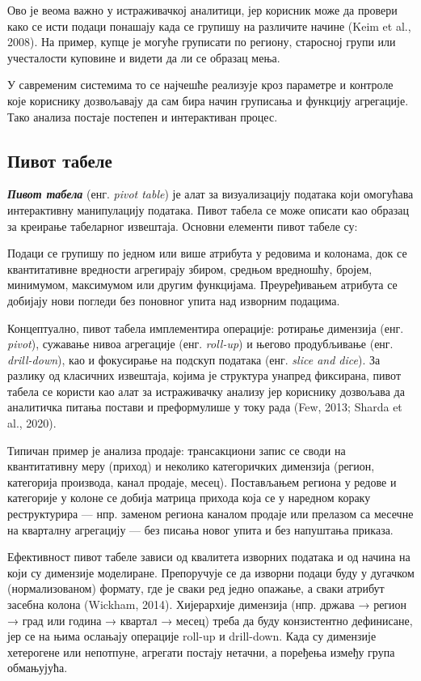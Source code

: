 Ово је веома важно у истраживачкој аналитици, јер корисник може да провери како се исти подаци понашају када се групишу на различите начине (Keim et al., 2008). На пример, купце је могуће груписати по региону, старосној групи или учесталости куповине и видети да ли се образац мења.

У савременим системима то се најчешће реализује кроз параметре и контроле које кориснику дозвољавају да сам бира начин груписања и функцију агрегације. Тако анализа постаје постепен и интерактиван процес.

\subsection{Пивот табеле}
\textbf{\textit{Пивот табела}} (енг. \textit{pivot table}) је алат за визуализацију података који омогућава интерактивну манипулацију података. Пивот табела се може описати као образац за креирање табеларног извештаја. Основни елементи пивот табеле су:

Подаци се групишу по једном или више атрибута у редовима и колонама, док се квантитативне вредности агрегирају збиром, средњом вредношћу, бројем, минимумом, максимумом или другим функцијама. Преуређивањем атрибута се добијају нови погледи без поновног упита над изворним подацима.

Концептуално, пивот табела имплементира операције: ротирање димензија (енг. \textit{pivot}), сужавање нивоа агрегације (енг. \textit{roll-up}) и његово продубљивање (енг. \textit{drill-down}), као и фокусирање на подскуп података (енг. \textit{slice and dice}). За разлику од класичних извештаја, којима је структура унапред фиксирана, пивот табела се користи као алат за истраживачку анализу јер кориснику дозвољава да аналитичка питања постави и преформулише у току рада (Few, 2013; Sharda et al., 2020).

Типичан пример је анализа продаје: трансакциони запис се своди на квантитативну меру (приход) и неколико категоричких димензија (регион, категорија производа, канал продаје, месец). Постављањем региона у редове и категорије у колоне се добија матрица прихода која се у наредном кораку реструктурира — нпр. заменом региона каналом продаје или прелазом са месечне на кварталну агрегацију — без писања новог упита и без напуштања приказа.

Ефективност пивот табеле зависи од квалитета изворних података и од начина на који су димензије моделиране. Препоручује се да изворни подаци буду у дугачком (нормализованом) формату, где је сваки ред једно опажање, а сваки атрибут засебна колона (Wickham, 2014). Хијерархије димензија (нпр. држава → регион → град или година → квартал → месец) треба да буду конзистентно дефинисане, јер се на њима ослањају операције roll-up и drill-down. Када су димензије хетерогене или непотпуне, агрегати постају нетачни, а поређења између група обмањујућа.

